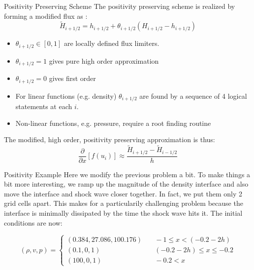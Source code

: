 \documentclass[9pt]{beamer}
\begin{document}
\begin{frame}{Positivity Preserving Scheme}
  The positivity preserving scheme is realized by forming a modified flux as \cite{Positivity2013,Positivity2014}: 
  $$\tilde{H}_{i+1/2}=h_{i+1/2} + \theta_{i+1/2}(H_{i+1/2} - h_{i+1/2})$$
  
  \begin{itemize}
    \item $\theta_{i+1/2} \in [0,1]$ are locally defined flux limiters.
    \item $\theta_{i+1/2} =1$ gives pure high order approximation
    \item $\theta_{i+1/2} =0$ gives first order
    \item For linear functions (e.g. density) $\theta_{i+1/2}$ are found by a sequence of 4 logical statements at each $i$. 
    \item Non-linear functions, e.g. pressure, require a root finding routine
  \end{itemize}

  The modified, high order, positivity preserving approximation is thus:
  $$
  \frac{\partial}{\partial x}[f(u_i)] \approx \frac{\tilde{H}_{i+1 /2} - \tilde{H}_{i-1/2}}{h}
  $$
\end{frame}

\begin{frame}{Positivity Example}
  Here we modify the previous problem a bit.  To make things a bit more interesting, we ramp up the magnitude of the density interface and also move the interface and shock wave closer together.  In fact, we put them only 2 grid cells apart.  This makes for a particularily challenging problem because the interface is minimally dissipated by the time the shock wave hits it. The initial conditions are now:

  $$
  (\rho, v, p) = 
  \begin{cases} 
  (0.384,27.086,100.176)& \quad -1 \leq x < (-0.2 - 2h) \\
  (0.1,0,1)& \quad (-0.2 - 2h) \leq x \leq -0.2\\
  (100,0,1)& \quad  -0.2 < x
  \end{cases}
  $$
\end{frame}
\end{document}
